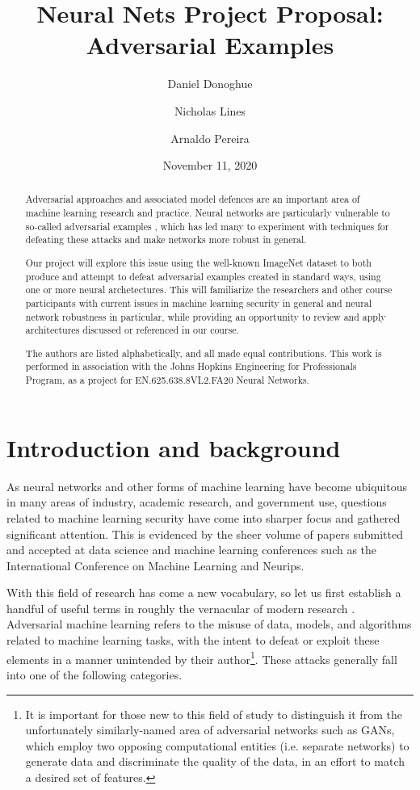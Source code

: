 \documentclass{amsproc}
\theoremstyle{definition}
\numberwithin{equation}{section}
\begin{document}
\title[Adversarial Examples]{Neural Nets Project Proposal: Adversarial
Examples}
\author{Daniel Donoghue}
\author{Nicholas Lines}
\author{Arnaldo Pereira}
\date{November 11, 2020}

\begin{abstract}
Adversarial approaches and associated model defences are an important area
of machine learning research and practice. Neural networks are particularly
vulnerable to so-called adversarial examples \cite{szegedy2014intriguing},
which has led many to experiment with techniques for defeating these attacks
and make networks more robust in general. 

Our project will explore this issue using the well-known ImageNet dataset to
both produce and attempt to defeat adversarial examples created in standard
ways, using one or more neural archetectures. This will familiarize the
researchers and other course participants with current issues in machine
learning security in general and neural network robustness in particular,
while providing an opportunity to review and apply architectures discussed
or referenced in our course.

The authors are listed alphabetically, and all made equal contributions.
This work is performed in association with the Johns Hopkins Engineering for
Professionals Program, as a project for EN.625.638.8VL2.FA20 Neural Networks.
\end{abstract}

\maketitle

\section{Introduction and background}

As neural networks and other forms of machine learning have become
ubiquitous in many areas of industry, academic research, and government use,
questions related to machine learning security have come into sharper focus
and gathered significant attention. This is evidenced by the sheer volume of
papers submitted and accepted at data science and machine learning
conferences such as the International Conference on Machine Learning and
Neurips. 

With this field of research has come a new vocabulary, so let us first
establish a handful of useful terms in roughly the vernacular of modern
research \cite{wiki:aml}. Adversarial machine learning refers to the misuse
of data, models, and algorithms related to machine learning tasks, with the
intent to defeat or exploit these elements in a manner unintended by their
author\footnote{%
It is important for those new to this field of study to distinguish it from
the unfortunately similarly-named area of adversarial networks such as GANs,
which employ two opposing computational entities (i.e. separate networks) to
generate data and discriminate the quality of the data, in an effort to
match a desired set of features. }. These attacks generally fall into one of
the following categories.
\end{document}
